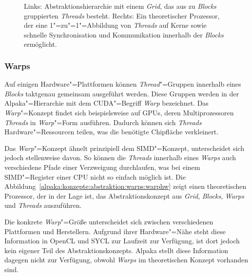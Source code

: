 \begin{figure}
\begin{tikzpicture}
    \end{tikzpicture}
    \caption{Links: Abstraktionshierarchie mit einem \textit{Grid}, das aus
             zu \textit{Blocks} gruppierten \textit{Threads} besteht.
             Rechts: Ein theoretischer Prozessor, der eine 1"=zu"=1"=Abbildung
             von \textit{Threads} auf Kerne sowie schnelle Synchronisation und
             Kommunikation innerhalb der \textit{Blocks} ermöglicht.
             \cite[nach][19]{worpitz2015}}
    \label{alpaka:konzepte:abstraktion:blocks:gridblockhw}
\end{figure}

\subsubsection{Warps}

Auf einigen Hardware"=Plattformen können \textit{Thread}"=Gruppen innerhalb
eines \textit{Blocks} taktgenau gemeinsam ausgeführt werden. Diese Gruppen
werden in der Alpaka"=Hierarchie mit dem \mbox{CUDA}"=Begriff \textit{Warp}
bezeichnet. Das \textit{Warp}"=Konzept findet sich beispielsweise auf GPUs,
deren Multiprozessoren \textit{Threads} in \textit{Warp}"=Form ausführen.
Dadurch können sich \textit{Threads} Hardware"=Ressourcen teilen, was die
benötigte Chipfläche verkleinert.

Das \textit{Warp}"=Konzept ähnelt prinzipiell dem SIMD"=Konzept, unterscheidet
sich jedoch stellenweise davon. So können die \textit{Threads} innerhalb eines
\textit{Warps} auch verschiedene Pfade einer Verzweigung durchlaufen, was bei
einem SIMD"=Register einer CPU nicht so einfach möglich ist. Die
Abbildung~\ref{alpaka:konzepte:abstraktion:warps:warphw} zeigt einen
theoretischen Prozessor, der in der Lage ist, das Abstraktionskonzept aus
\textit{Grid}, \textit{Blocks}, \textit{Warps} und \textit{Threads} auszuführen.

Die konkrete \textit{Warp}"=Größe unterscheidet sich zwischen verschiedenen
Plattformen und Herstellern. Aufgrund ihrer Hardware"=Nähe steht diese
Information in OpenCL und SYCL zur Laufzeit zur Verfügung, ist dort jedoch kein
eigener Teil des Abstraktionskonzepts. Alpaka stellt diese Information dagegen
nicht zur Verfügung, obwohl \textit{Warps} im theoretischen Konzept vorhanden
sind.


